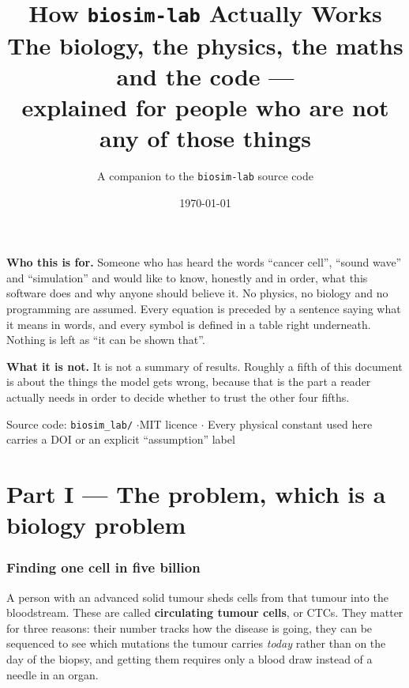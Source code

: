 \documentclass[11pt,a4paper]{article}
\title{\vspace{-1.2cm}\sffamily\bfseries
  How \texttt{biosim-lab} Actually Works\\[4pt]
  \large\mdseries The biology, the physics, the maths and the code ---\\
  \large\mdseries explained for people who are not any of those things}
\author{\sffamily\normalsize A companion to the \texttt{biosim-lab} source code}
\date{\sffamily\small\today}
\begin{document}
\maketitle
\thispagestyle{empty}

\begin{center}
\begin{minipage}{0.86\textwidth}
\small\color{muted}
\textbf{Who this is for.} Someone who has heard the words ``cancer cell'',
``sound wave'' and ``simulation'' and would like to know, honestly and in
order, what this software does and why anyone should believe it.
No physics, no biology and no programming are assumed. Every equation is
preceded by a sentence saying what it means in words, and every symbol is
defined in a table right underneath. Nothing is left as ``it can be shown
that''.

\medskip
\textbf{What it is not.} It is not a summary of results. Roughly a fifth of
this document is about the things the model gets wrong, because that is the
part a reader actually needs in order to decide whether to trust the other
four fifths.
\end{minipage}
\end{center}

\vfill
\begin{center}
\small\color{muted}
Source code: \texttt{biosim\_lab/} \quad$\cdot$\quad MIT licence \quad$\cdot$\quad
Every physical constant used here carries a DOI or an explicit ``assumption'' label
\end{center}
\clearpage

\tableofcontents
\clearpage

\part*{Part I --- The problem, which is a biology problem}
\section{Finding one cell in five billion}

A person with an advanced solid tumour sheds cells from that tumour into the
bloodstream. These are called \textbf{circulating tumour cells}, or CTCs. They
matter for three reasons: their number tracks how the disease is going, they can
be sequenced to see which mutations the tumour carries \emph{today} rather than
on the day of the biopsy, and getting them requires only a blood draw instead of
a needle in an organ.
\end{document}
